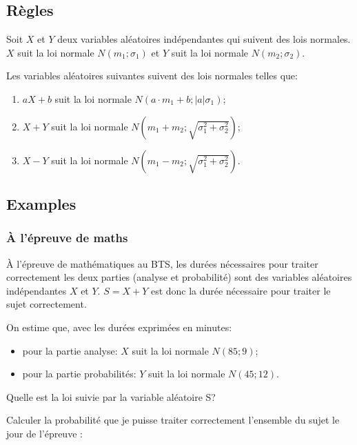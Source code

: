 \documentclass[a4paper,12pt]{scrartcl}
\begin{document}
\subsection{Règles}

Soit $X$ et $Y$ deux variables aléatoires indépendantes qui suivent des lois normales. $X$ suit la loi normale $N(m_1;\sigma_1)$ et $Y$ suit la loi normale $N(m_2;\sigma_2)$.

Les variables aléatoires suivantes suivent des lois normales telles que:

\begin{enumerate}
 \item $aX + b$ suit la loi normale $N(a \cdot m_1 +b;|a|\sigma_1)$;
 \item $X + Y$ suit la loi normale $N(m_1+ m_2;\sqrt{\sigma_1^2 + \sigma_2^2})$;
 \item $X - Y$ suit la loi normale $N(m_1- m_2;\sqrt{\sigma_1^2 + \sigma_2^2})$.
\end{enumerate}

\subsection{Examples}

\subsubsection{À l'épreuve de maths}

À l'épreuve de mathématiques au BTS, les durées nécessaires pour traiter correctement les deux parties (analyse et probabilité) sont des variables aléatoires indépendantes $X$ et $Y$. $S = X + Y$ est donc la durée nécessaire pour traiter le sujet correctement. 

On estime que, avec les durées exprimées en minutes:

\begin{itemize}
 \item pour la partie analyse: $X$ suit la loi normale $N(85;9)$;
 \item pour la partie probabilités: $Y$ suit la loi normale $N(45;12)$. 
\end{itemize}

Quelle est la loi suivie par la variable aléatoire S?


Calculer la probabilité que je puisse traiter correctement l’ensemble du sujet le jour de l’épreuve :

\end{document}
